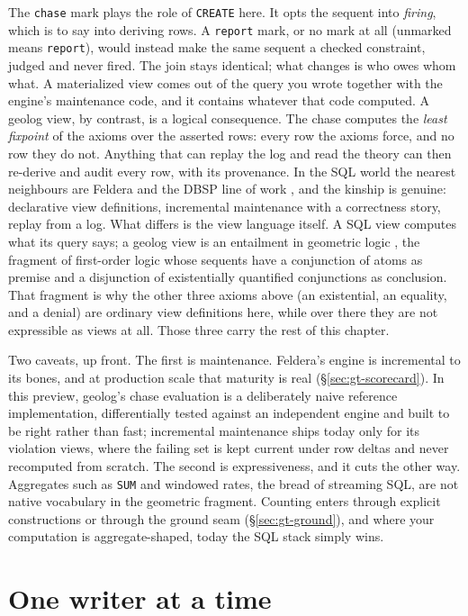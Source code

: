 \noindent The \texttt{chase} mark plays the role of \texttt{CREATE}
here. It opts the sequent into \emph{firing}, which is to say into
deriving rows. A \texttt{report} mark, or no mark at all (unmarked
means \texttt{report}), would instead make the same sequent a checked
constraint, judged and never fired. The join stays identical; what
changes is who owes whom what. A materialized view comes out of the
query you wrote together with the engine's maintenance code, and it
contains whatever that code computed. A geolog view, by contrast, is a
logical consequence. The chase computes the \emph{least fixpoint} of
the axioms over the asserted rows: every row the axioms force, and no
row they do not. Anything that can replay the log and read the theory
can then re-derive and audit every row, with its provenance. In the
SQL world the nearest neighbours are Feldera and the DBSP line of work
\cite{budiu22}, and the kinship is genuine: declarative view
definitions, incremental maintenance with a correctness story, replay
from a log. What differs is the view language itself. A SQL view
computes what its query says; a geolog view is an entailment in
geometric logic \cite[Part~D1]{johnstone2002}, the fragment of
first-order logic whose sequents have a conjunction of atoms as
premise and a disjunction of existentially quantified conjunctions as
conclusion. That fragment is why the other three axioms above (an
existential, an equality, and a denial) are ordinary view
definitions here, while over there they are not expressible as views
at all. Those three carry the rest of this chapter.

Two caveats, up front. The first is maintenance. Feldera's engine is
incremental to its bones, and at production scale that maturity is
real (\S\ref{sec:gt-scorecard}). In this preview, geolog's chase
evaluation is a deliberately naive reference implementation,
differentially tested against an independent engine and built to be
right rather than fast; incremental maintenance ships today only for
its violation views, where the failing set is kept current under row
deltas and never recomputed from scratch. The second is expressiveness,
and it cuts the other way. Aggregates such as \texttt{SUM} and
windowed rates, the bread of streaming SQL, are not native vocabulary
in the geometric fragment. Counting enters through explicit
constructions or through the ground seam (\S\ref{sec:gt-ground}), and
where your computation is aggregate-shaped, today the SQL stack simply
wins.

\section{One writer at a time}
\label{sec:gt-single}

